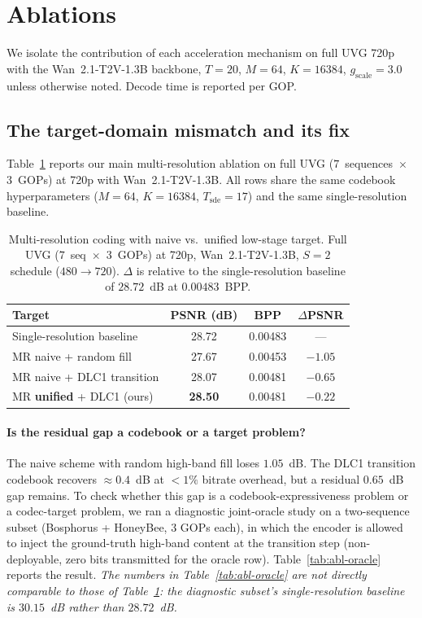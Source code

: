 \section{Ablations}
\label{sec:ablations}

We isolate the contribution of each acceleration mechanism on full UVG
720p with the Wan~2.1-T2V-1.3B backbone, $T\!=\!20$, $M\!=\!64$,
$K\!=\!16384$, $g_\text{scale}\!=\!3.0$ unless otherwise noted. Decode
time is reported per GOP.

\subsection{The target-domain mismatch and its fix}
\label{sec:abl-lpraw}

Table~\ref{tab:abl-mr} reports our main multi-resolution ablation on full
UVG ($7$~sequences~$\times$~$3$~GOPs) at 720p with Wan~2.1-T2V-1.3B.
All rows share the same codebook hyperparameters ($M\!=\!64$,
$K\!=\!16384$, $T_\text{sde}\!=\!17$) and the same single-resolution
baseline.

\begin{table}[t]
\centering
\caption{Multi-resolution coding with naive vs.\ unified low-stage target.
Full UVG ($7$~seq~$\times$~$3$~GOPs) at 720p, Wan~2.1-T2V-1.3B,
$S\!=\!2$ schedule ($480\!\to\!720$). $\Delta$ is relative to the
single-resolution baseline of $28.72$~dB at $0.00483$~BPP.}
\label{tab:abl-mr}
\small
\begin{tabular}{@{}l c c c@{}}
\toprule
Target & PSNR (dB) & BPP & $\Delta$PSNR \\
\midrule
Single-resolution baseline   & 28.72 & 0.00483 & --- \\
\midrule
MR naive + random fill       & 27.67 & 0.00453 & $-1.05$ \\
MR naive + DLC1 transition   & 28.07 & 0.00481 & $-0.65$ \\
\rowcolor{wacvblue!10}
MR \textbf{unified} + DLC1 (ours) & \textbf{28.50} & 0.00481 & \textbf{$-0.22$} \\
\bottomrule
\end{tabular}
\end{table}

\paragraph{Is the residual gap a codebook or a target problem?}
The naive scheme with random high-band fill loses $1.05$~dB. The DLC1
transition codebook recovers $\approx 0.4$~dB at $<1\%$ bitrate overhead,
but a residual $0.65$~dB gap remains. To check whether this gap is a
codebook-expressiveness problem or a codec-target problem, we ran a
diagnostic joint-oracle study on a two-sequence subset
(Bosphorus + HoneyBee, $3$ GOPs each), in which the encoder is allowed
to inject the ground-truth high-band content at the transition step
(non-deployable, zero bits transmitted for the oracle row).
Table~\ref{tab:abl-oracle} reports the result. \emph{The numbers in
Table~\ref{tab:abl-oracle} are not directly comparable to those of
Table~\ref{tab:abl-mr}: the diagnostic subset's single-resolution
baseline is $30.15$~dB rather than $28.72$~dB.}

